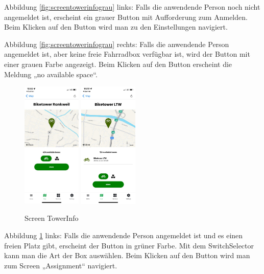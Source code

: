 \noindent Abbildung \ref{fig:screentowerinfograu} links: Falls die anwendende Person noch nicht angemeldet ist, erscheint ein grauer Button mit Aufforderung zum Anmelden. Beim Klicken auf den Button wird man zu den Einstellungen navigiert.

\noindent Abbildung \ref{fig:screentowerinfograu} rechts: Falls die anwendende Person angemeldet ist, aber keine freie Fahrradbox verfügbar ist, wird der Button mit einer grauen Farbe angezeigt. Beim Klicken auf den Button erscheint die Meldung „no available space“.

\begin{figure}[H]
  \centering
  \includegraphics[width=0.25\textwidth]{images/app-screenshots/screentowerinfoc.png}
  \includegraphics[width=0.25\textwidth]{images/app-screenshots/screentowerinfod.png}
  \caption{Screen TowerInfo}
  \label{fig:screentowerinfo}
\end{figure}

\noindent Abbildung \ref{fig:screentowerinfo} links: Falls die anwendende Person angemeldet ist und es einen freien Platz gibt, erscheint der Button in grüner Farbe. Mit dem SwitchSelector kann man die Art der Box auswählen. Beim Klicken auf den Button wird man zum Screen „Assignment“ navigiert.

